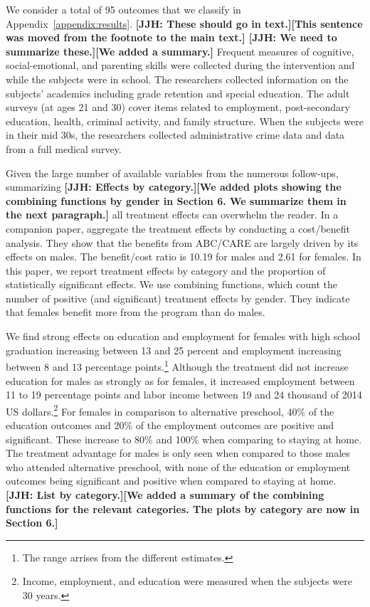 We consider a total of 95 outcomes that we classify in Appendix~\ref{appendix:results}. \textbf{[JJH: These should go in text.][This sentence was moved from the footnote to the main text.] [JJH: We need to summarize these.][We added a summary.]} Frequent measures of cognitive, social-emotional, and parenting skills were collected during the intervention and while the subjects were in school. The researchers collected information on the subjects' academics including grade retention and special education. The adult surveys (at ages 21 and 30) cover items related to employment, post-secondary education, health, criminal activity, and family structure. When the subjects were in their mid 30s, the researchers collected administrative crime data and data from a full medical survey.

Given the large number of available variables from the numerous follow-ups, summarizing \textbf{[JJH: Effects by category.][We added plots showing the combining functions by gender in Section 6. We summarize them in the next paragraph.]} all treatment effects can overwhelm the reader. In a companion paper, \citet{Garcia_Heckman_Leaf_etal_2017_Comp_CBA_Unpublished} aggregate the treatment effects by conducting a cost/benefit analysis. They show that the benefits from ABC/CARE are largely driven by its effects on males. The benefit/cost ratio is 10.19 for males and 2.61 for females. In this paper, we report treatment effects by category and the proportion of statistically significant effects. We use combining functions, which count the number of positive (and significant) treatment effects by gender. They indicate that females benefit more from the program than do males.

We find strong effects on education and employment for females with high school graduation increasing between 13 and 25 percent and employment increasing between 8 and 13 percentage points.\footnote{The range arrises from the different estimates.} Although the treatment did not increase education for males as strongly as for females, it increased employment between 11 to 19 percentage points and labor income between 19 and 24 thousand of 2014 US dollars.\footnote{Income, employment, and education were measured when the subjects were 30 years.}  For females in comparison to alternative preschool, 40\% of the education outcomes and 20\% of the employment outcomes are positive and significant. These increase to 80\% and 100\% when comparing to staying at home. The treatment advantage for males is only seen when compared to those males who attended alternative preschool, with none of the education or employment outcomes being significant and positive when compared to staying at home. \textbf{[JJH: List by category.][We added a summary of the combining functions for the relevant categories. The plots by category are now in Section 6.]}

